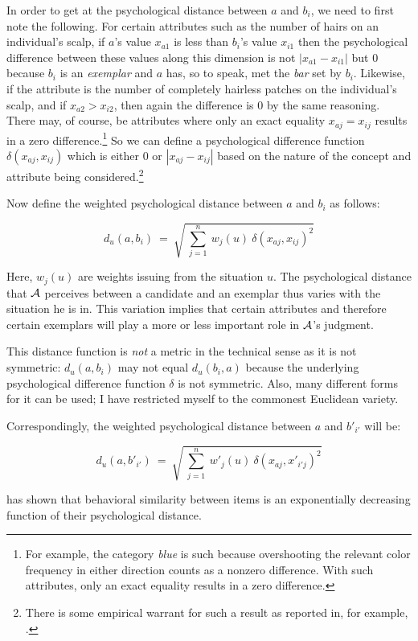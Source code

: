In order to get at the psychological distance between $a$ and $b_i$, we need to first note the following. For certain attributes such as the number of hairs on an individual's scalp, if $a$'s value $x_{a1}$ is less than $b_i$'s value $x_{i1}$ then the psychological difference between these values along this dimension is not $|x_{a1} - x_{i1}|$ but $0$ because $b_i$ is an \emph{exemplar} and $a$ has, so to speak, met the \emph{bar} set by $b_i$. Likewise, if the attribute is the number of completely hairless patches on the individual's scalp, and if $x_{a2} > x_{i2}$, then again the difference is $0$ by the same reasoning. There may, of course, be attributes where only an exact equality $x_{aj} = x_{ij}$ results in a zero difference.\footnote{For example, the category \emph{blue} is such because overshooting the relevant color frequency in either direction counts as a nonzero difference. With such attributes, only an exact equality results in a zero difference.} So we can define a psychological difference function $\delta(x_{aj}, x_{ij})$ which is either $0$ or $|x_{aj} - x_{ij}|$ based on the nature of the concept and attribute being considered.\footnote{There is some empirical warrant for such a result as reported in, for example, \citet{hes:ccpc}.}

Now define the weighted psychological distance between $a$ and $b_i$ as follows:

\[ d_u(a, b_i)\ = \ \sqrt{\ \sum_{j = 1}^{n}\ w_j(u)\ \delta(x_{aj}, x_{ij})^2} \]

\noindent Here, $w_j(u)$ are weights issuing from the situation $u$. The psychological distance that $\cal A$ perceives between a candidate and an exemplar thus varies with the situation he is in. This variation implies that certain attributes and therefore certain exemplars will play a more or less important role in $\cal A$'s judgment.

This distance function is \emph{not} a metric in the technical sense as it is not symmetric: $d_u(a, b_i)$ may not equal $d_u(b_i, a)$ because the underlying psychological difference function $\delta$ is not symmetric. Also, many different forms for it can be used; I have restricted myself to the commonest Euclidean variety.

Correspondingly, the weighted psychological distance between $a$ and $b'_{i'}$ will be:

\[ d_u(a, b'_{i'})\ = \ \sqrt{\ \sum_{j = 1}^{n}\ w'_j(u)\ \delta(x_{aj}, x'_{i'j})^2} \]

\citet{shepard:ulg} has shown that behavioral similarity between items is an exponentially decreasing function of their psychological distance.


